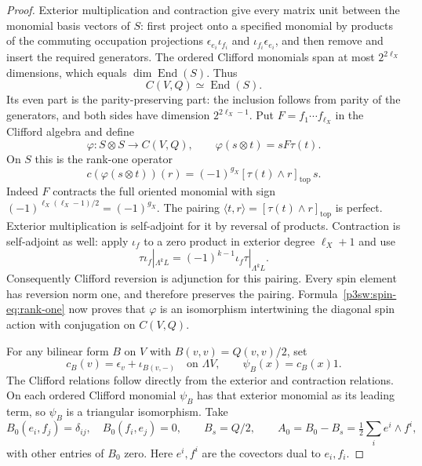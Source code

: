 \documentclass[11pt]{article}
\numberwithin{equation}{section}
\begin{document}
\begin{proof}
Exterior multiplication and contraction give every matrix unit
between the monomial basis vectors of \(S\): first project onto a
specified monomial by products of the commuting occupation
projections \(\epsilon_{e_i}\iota_{f_i}\) and
\(\iota_{f_i}\epsilon_{e_i}\), and then remove and insert the required
generators.  The ordered Clifford monomials span at most
\(2^{2\ell_X}\) dimensions, which equals \(\dim\operatorname{End}(S)\).
Thus
\[
 C(V,Q)\simeq\operatorname{End}(S).
\]
Its even part is the parity-preserving part: the inclusion follows
from parity of the generators, and both sides have dimension
\(2^{2\ell_X-1}\).  Put \(F=f_1\cdots f_{\ell_X}\)
in the Clifford algebra and define
\[
 \varphi:S\otimes S\longrightarrow C(V,Q),\qquad
 \varphi(s\otimes t)=sF\tau(t).
\]
On \(S\) this is the rank-one operator
\begin{equation}
\label{p3sw:spin-eq:rank-one}
 c(\varphi(s\otimes t))(r)
   =(-1)^{g_X}[\tau(t)\wedge r]_{\mathrm{top}}\,s.
\end{equation}
Indeed \(F\) contracts the full oriented monomial with sign
\((-1)^{\ell_X(\ell_X-1)/2}=(-1)^{g_X}\).  The pairing
\(\langle t,r\rangle=[\tau(t)\wedge r]_{\mathrm{top}}\) is perfect.
Exterior multiplication is self-adjoint for it by reversal of
products.  Contraction is self-adjoint as well: apply \(\iota_f\)
to a zero product in exterior degree \(\ell_X+1\) and use
\[
 \tau\iota_f|_{\Lambda^kL}
     =(-1)^{k-1}\iota_f\tau|_{\Lambda^kL}.
\]
Consequently Clifford reversion is adjunction for this pairing.
Every spin element has reversion norm one, and therefore preserves
the pairing.  Formula~\eqref{p3sw:spin-eq:rank-one} now proves that
\(\varphi\) is an isomorphism intertwining the diagonal spin action
with conjugation on \(C(V,Q)\).

For any bilinear form \(B\) on \(V\) with \(B(v,v)=Q(v,v)/2\), set
\[
 c_B(v)=\epsilon_v+\iota_{B(v,-)}
       \quad\text{on }\Lambda V,\qquad
 \psi_B(x)=c_B(x)1 .
\]
The Clifford relations follow directly from the exterior and
contraction relations.  On each ordered Clifford monomial
\(\psi_B\) has that exterior monomial as its leading term, so
\(\psi_B\) is a triangular isomorphism.  Take
\[
 B_0(e_i,f_j)=\delta_{ij},\quad B_0(f_i,e_j)=0,\qquad
 B_s=Q/2,\qquad
 A_0=B_0-B_s=\tfrac12\sum_i e^i\wedge f^i,
\]
with other entries of \(B_0\) zero.  Here \(e^i,f^i\) are the
covectors dual to \(e_i,f_i\).


\end{proof}
\end{document}
